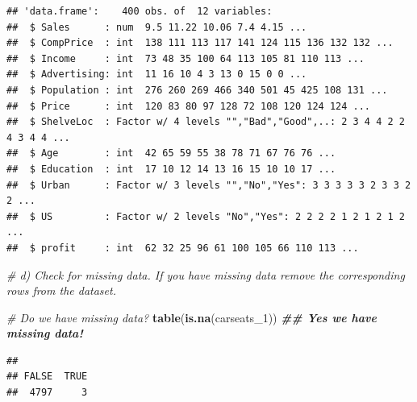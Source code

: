 \documentclass[
]{article}
\newenvironment{Shaded}{\begin{snugshade}}{\end{snugshade}}
\newcommand{\CommentTok}[1]{\textcolor[rgb]{0.56,0.35,0.01}{\textit{#1}}}
\newcommand{\DocumentationTok}[1]{\textcolor[rgb]{0.56,0.35,0.01}{\textbf{\textit{#1}}}}
\newcommand{\FunctionTok}[1]{\textcolor[rgb]{0.13,0.29,0.53}{\textbf{#1}}}
\newcommand{\NormalTok}[1]{#1}
\newcommand{\OtherTok}[1]{\textcolor[rgb]{0.56,0.35,0.01}{#1}}
\newcommand{\SpecialCharTok}[1]{\textcolor[rgb]{0.81,0.36,0.00}{\textbf{#1}}}
\begin{document}
\begin{Shaded}
\end{Shaded}

\begin{verbatim}
## 'data.frame':    400 obs. of  12 variables:
##  $ Sales      : num  9.5 11.22 10.06 7.4 4.15 ...
##  $ CompPrice  : int  138 111 113 117 141 124 115 136 132 132 ...
##  $ Income     : int  73 48 35 100 64 113 105 81 110 113 ...
##  $ Advertising: int  11 16 10 4 3 13 0 15 0 0 ...
##  $ Population : int  276 260 269 466 340 501 45 425 108 131 ...
##  $ Price      : int  120 83 80 97 128 72 108 120 124 124 ...
##  $ ShelveLoc  : Factor w/ 4 levels "","Bad","Good",..: 2 3 4 4 2 2 4 3 4 4 ...
##  $ Age        : int  42 65 59 55 38 78 71 67 76 76 ...
##  $ Education  : int  17 10 12 14 13 16 15 10 10 17 ...
##  $ Urban      : Factor w/ 3 levels "","No","Yes": 3 3 3 3 3 2 3 3 2 2 ...
##  $ US         : Factor w/ 2 levels "No","Yes": 2 2 2 2 1 2 1 2 1 2 ...
##  $ profit     : int  62 32 25 96 61 100 105 66 110 113 ...
\end{verbatim}

\begin{Shaded}
\begin{Highlighting}[]
\CommentTok{\# d)  Check for missing data. If you have missing data remove the corresponding rows from the dataset.}
  
    \CommentTok{\# Do we have missing data?}
  \FunctionTok{table}\NormalTok{(}\FunctionTok{is.na}\NormalTok{(carseats\_1)) }\DocumentationTok{\#\# Yes we have missing data!}
\end{Highlighting}
\end{Shaded}

\begin{verbatim}
## 
## FALSE  TRUE 
##  4797     3
\end{verbatim}
\end{document}
